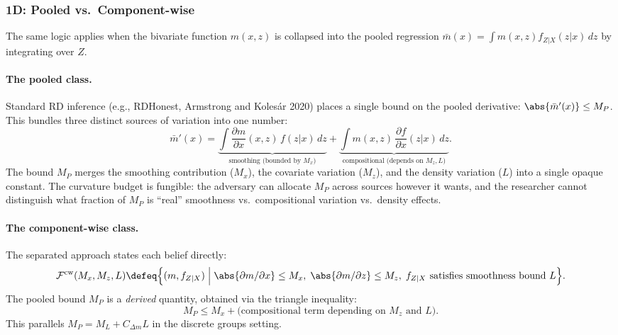 \subsubsection*{1D: Pooled vs.\ Component-wise}

The same logic applies when the bivariate function $m(x,z)$ is collapsed into the pooled regression $\bar{m}(x) = \int m(x,z) f_{Z|X}(z|x)\, dz$ by integrating over $Z$.

\paragraph{The pooled class.}
Standard RD inference (e.g., RDHonest, Armstrong and Kolesár 2020) places a single bound on the pooled derivative: $\abs{\bar{m}'(x)} \leq M_P$.
This bundles three distinct sources of variation into one number:
\begin{equation*}
	\bar{m}'(x) = \underbrace{\int \frac{\partial m}{\partial x}(x,z)\, f(z|x)\, dz}_{\text{smoothing (bounded by } M_x\text{)}} + \underbrace{\int m(x,z)\, \frac{\partial f}{\partial x}(z|x)\, dz}_{\text{compositional (depends on } M_z, L\text{)}}.
\end{equation*}
The bound $M_P$ merges the smoothing contribution ($M_x$), the covariate variation ($M_z$), and the density variation ($L$) into a single opaque constant.
The curvature budget is fungible: the adversary can allocate $M_P$ across sources however it wants, and the researcher cannot distinguish what fraction of $M_P$ is ``real'' smoothness vs.\ compositional variation vs.\ density effects.

\paragraph{The component-wise class.}
The separated approach states each belief directly:
\begin{equation*}
	\mathcal{F}^{\mathrm{cw}}(M_x, M_z, L) \defeq \Bigl\{ (m, f_{Z|X}) \;\Big|\; \abs{\partial m / \partial x} \leq M_x,\; \abs{\partial m / \partial z} \leq M_z,\; f_{Z|X} \text{ satisfies smoothness bound } L \Bigr\}.
\end{equation*}
The pooled bound $M_P$ is a \emph{derived} quantity, obtained via the triangle inequality:
\begin{equation*}
	M_P \leq M_x + \text{(compositional term depending on $M_z$ and $L$)}.
\end{equation*}
This parallels $M_P = M_L + C_{\Delta m} L$ in the discrete groups setting.

